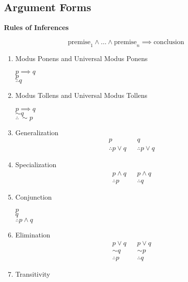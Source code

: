 \documentclass[landscape, a4paper]{article}
\newcommand{\Or}{\vee}
\renewcommand{\and}{\wedge}
\newcommand{\customsection}[1]{
    \vspace*{-16pt}
    \section*{#1}
    \vspace*{-4pt}
}
\newcommand{\heading}[1]{
    \noindent\textbf{#1}
}
\newenvironment{wenumerate}{\begin{enumerate}[wide, labelindent=2pt]}{\end{enumerate}}
\begin{document}
\begin{multicols*}{4}
    \customsection{Argument Forms}
    \heading{Rules of Inferences}
    \[
        \text{premise}_1\and \ldots\and \text{premise}_n \implies \text{conclusion}
    \]
    \begin{wenumerate}
        \item Modus Ponens and Universal Modus Ponens
        \vspace{-4pt} \par {\centering
            $p \implies q$ \\
            $p$           \\
            $\therefore q $ \par
        }
        \item Modus Tollens and Universal Modus Tollens
        \vspace{-4pt} \par {\centering
        $p \implies q$ \\
        ${\sim} q$           \\
        $\therefore\ {\sim} p $ \par
        }
        \item Generalization
        \begin{align*}
            p                   &  & q                  \\
            \therefore p  \Or q &  & \therefore p \Or q
        \end{align*}
        \item Specialization
        \begin{align*}
            p \and q     &  & p \and q     \\
            \therefore p &  & \therefore q
        \end{align*}
        \item Conjunction
        \vspace{-4pt} \par {\centering
            $p$ \\
            $q$           \\
            $\therefore p \and q $ \par
        }
        \item Elimination
        \begin{align*}
            p \Or q      &  & p \Or q      \\
            {\sim} q     &  & {\sim} p     \\
            \therefore p &  & \therefore q
        \end{align*}
        \item Transitivity

\end{wenumerate}
\end{multicols*}
\end{document}

